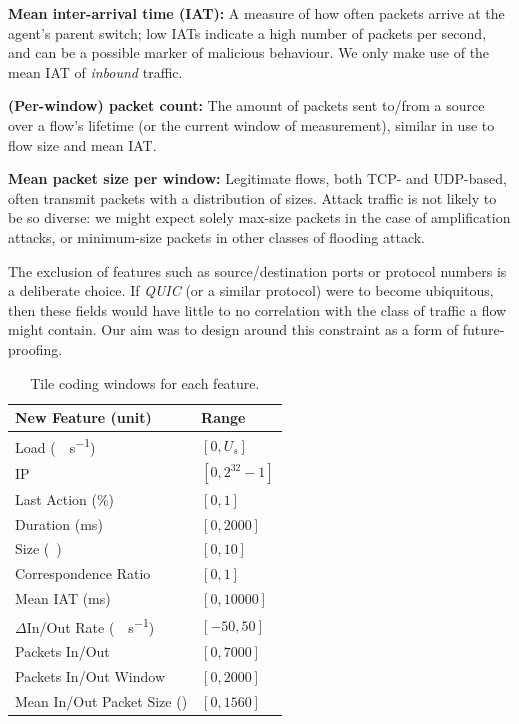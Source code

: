 \documentclass[10pt, times, comsoc]{IEEEtran}
\newcommand{\fakepara}[1]{\noindent\textbf{#1:}}
\begin{document}
\fakepara{Mean inter-arrival time (IAT)}
A measure of how often packets arrive at the agent's parent switch; low IATs indicate a high number of packets per second, and can be a possible marker of malicious behaviour.
We only make use of the mean IAT of \emph{inbound} traffic.

\fakepara{(Per-window) packet count}
The amount of packets sent to/from a source over a flow's lifetime (or the current window of measurement), similar in use to flow size and mean IAT.

\fakepara{Mean packet size per window}
Legitimate flows, both TCP- and UDP-based, often transmit packets with a distribution of sizes.
Attack traffic is not likely to be so diverse: we might expect solely max-size packets in the case of amplification attacks, or minimum-size packets in other classes of flooding attack.

The exclusion of features such as source/destination ports or protocol numbers is a deliberate choice.
If \emph{QUIC} (or a similar protocol) were to become ubiquitous, then these fields would have little to no correlation with the class of traffic a flow might contain.
Our aim was to design around this constraint as a form of future-proofing.

\begin{table}
	\centering
	\caption{Tile coding windows for each feature.\label{tab:codings}}
	
	\begin{tabular}{@{}ll@{}}
		\toprule
		New Feature (unit) & Range \\
		\midrule
		Load (\si{\mega\bit\per\second}) & $[0, U_s]$ \\
		IP & $[0, 2^{32}-1]$ \\
		Last Action (\si{\percent}) & $[0, 1]$ \\
		Duration (\si{\milli\second}) & $[0, \num{2000}]$ \\
		Size (\si{\mebi\byte}) & $[0,10]$ \\
		Correspondence Ratio & $[0,1]$ \\
		Mean IAT (\si{\milli\second}) & $[0, \num{10000}]$ \\
		$\Delta$In/Out Rate (\si{\mega\bit\per\second}) & $[-50, 50]$ \\
		Packets In/Out & $[0, 7000]$ \\
		Packets In/Out Window & $[0, 2000]$ \\
		Mean In/Out Packet Size (\si{\byte}) & $[0, 1560]$ \\
		\bottomrule
	\end{tabular}
\end{table}
\end{document}

